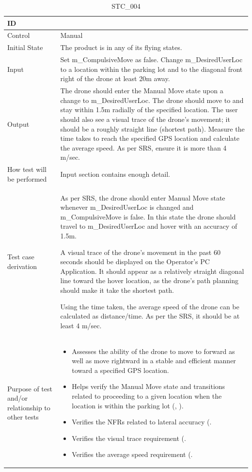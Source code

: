 \documentclass[12pt, titlepage]{article}
\begin{document}
\begin{table}[!h]
\begin{center}
\caption {STC\_004}
\label{tab:STC_004}
\begin{tabular}{ | m{3.2cm} | m{12.2cm} | } 
\hline
ID & \nameref{tab:STC_004} \\ 
\hline
Control & Manual \\ 
\hline
Initial State & The product is in any of its flying states.   \\ 
\hline
Input & Set m\_CompulsiveMove as false. Change m\_DesiredUserLoc to a location within the parking lot and to the diagonal front right of the drone at least 20m away.  \\ 
\hline
Output & The drone should enter the Manual Move state upon a change to m\_DesiredUserLoc. The drone should move to and stay within 1.5m radially of the specified location. 
The user should also see a visual trace of the drone's movement; it should be a roughly straight line (shortest path).
Measure the time takes to reach the specified GPS location and calculate the average speed. As per SRS, ensure it is more than 4 m/sec.  \\ 
\hline
How test will be performed & Input section contains enough detail. \\ 
\hline
Test case derivation & As per SRS, the drone should enter Manual Move state whenever m\_DesiredUserLoc is changed and m\_CompulsiveMove is false. In this state the drone should travel to m\_DesiredUserLoc and hover with an accuracy of 1.5m. 

A visual trace of the drone's movement in the past 60 seconds should be displayed on the Operator's PC Application. It should appear as a relatively straight diagonal line toward the hover location, as the drone's path planning should make it take the shortest path. 

Using the time taken, the average speed of the drone can be calculated as distance/time. As per the SRS, it should be at least 4 m/sec. 
 \\ 
\hline
Purpose of test and/or relationship to other tests & 
\begin{itemize}
    \item Assesses the ability of the drone to move to forward as well as move rightward in a stable and efficient manner toward a specified GPS location.
    \item Helps verify the Manual Move state and transitions related to proceeding to a given location when the location is within the parking lot (\nameref{STA_002}, \nameref{TRANS_005}).
    \item Verifies the NFRs related to lateral accuracy (\nameref{PERF_008}. 
    \item Verifies the visual trace requirement (\nameref{USE_001}. 
    \item Verifies the average speed requirement (\nameref{PERF_003}. 
\end{itemize}
\\ 
\hline
\end{tabular}
\end{center}
\end{table}
\end{document}
